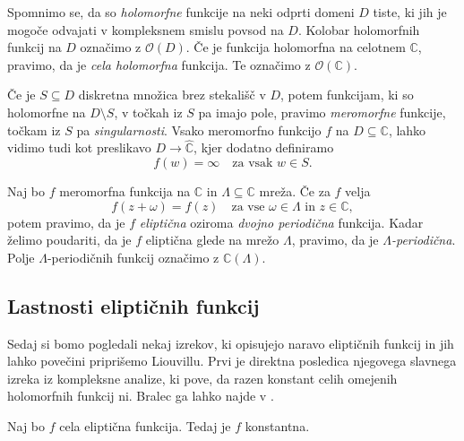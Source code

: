 \documentclass[mat1]{fmfdelo}
\numberwithin{equation}{section}
\newcommand{\C}{\mathbb C}
\newcommand{\RS}{\widehat{\C}}
\newcommand{\om}{\omega}
\newcommand{\hol}[1]{\mathcal{O}(#1)}
\theoremstyle{definition}
\begin{document}
Spomnimo se, da so \emph{holomorfne} funkcije na neki odprti domeni $D$ tiste, ki jih je mogoče odvajati v kompleksnem smislu povsod na $D$. Kolobar holomorfnih funkcij na $D$ označimo z $\hol{D}$. Če je funkcija holomorfna na celotnem $\C$, pravimo, da je \emph{cela holomorfna} funkcija. Te označimo z $\hol{\C}$.

Če je $S \subseteq D$ diskretna množica brez stekališč v $D$, potem funkcijam, ki so holomorfne na $D \setminus S$, v točkah iz $S$ pa imajo pole, pravimo \emph{meromorfne} funkcije, točkam iz $S$ pa \emph{singularnosti}. Vsako meromorfno funkcijo $f$ na $D \subseteq \C$, lahko vidimo tudi kot preslikavo $D \to \RS$, kjer dodatno definiramo 
\[
    f(w) = \infty \quad \text{za vsak $w \in S$.} 
\]

\begin{definicija}
    Naj bo $f$ meromorfna funkcija na $\C$ in $\Lambda \subseteq \C$ mreža. Če za $f$ velja
    \[
        f(z + \om) = f(z) \quad \text{za vse $\om \in \Lambda$ in $z \in \C$},
    \]
    potem pravimo, da je $f$ \emph{eliptična} oziroma \emph{dvojno periodična} funkcija. Kadar želimo poudariti, da je $f$ eliptična glede na mrežo $\Lambda$, pravimo, da je \emph{$\Lambda$-periodična}. Polje $\Lambda$-periodičnih funkcij označimo z $\C(\Lambda)$. %
\end{definicija}





\subsection{Lastnosti eliptičnih funkcij}

Sedaj si bomo pogledali nekaj izrekov, ki opisujejo naravo eliptičnih funkcij in jih lahko povečini priprišemo Liouvillu. Prvi je direktna posledica njegovega slavnega izreka iz kompleksne analize, ki pove, da razen konstant celih omejenih holomorfnih funkcij ni. Bralec ga lahko najde v \cite[]{}.

\begin{izrek}
    \label{cele el. funkcije}
    Naj bo $f$ cela eliptična funkcija. Tedaj je $f$ konstantna.
\end{izrek}
\end{document}

